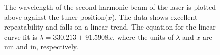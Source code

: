 \begin{figure}

\centering



\caption[Laser wavelength calibration chart]{The wavelength of the second harmonic beam of the laser is plotted above against the tuner position(\(x\)). The data shows excellent repeatability and falls on a linear trend. The equation for the linear curve fit is \(\lambda = 330.213 + 91.5908x\), where the units of \(\lambda\) and \(x\) are nm and in, respectively.}

\label{fig:laserCalibrationResults}

\end{figure}

